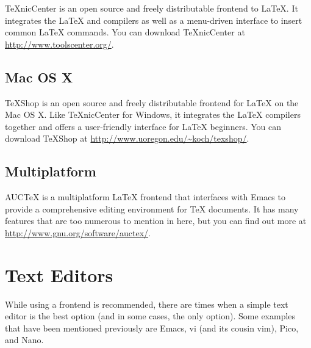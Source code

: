 \TeX{}nicCenter is an open source and freely distributable frontend to
\LaTeX{}.  It integrates the \LaTeX{} and \BibTeX{} compilers as well
as a menu-driven interface to insert common \LaTeX{} commands.  You
can download \TeX{}nicCenter at \url{http://www.toolscenter.org/}.

\subsection{Mac OS X}
\label{sec:mac-os-x-1}

\TeX{}Shop is an open source and freely distributable frontend for
\LaTeX{} on the Mac OS X.  Like \TeX{}nicCenter for Windows, it
integrates the \LaTeX{} compilers together and offers a user-friendly
interface for \LaTeX{} beginners.  You can download \TeX{}Shop at
\url{http://www.uoregon.edu/~koch/texshop/}.

\subsection{Multiplatform}
\label{sec:multiplatform}

AUC\TeX{} is a multiplatform \LaTeX{} frontend that interfaces with
Emacs to provide a comprehensive editing environment for \TeX{}
documents.  It has many features that are too numerous to mention in
here, but you can find out more at
\url{http://www.gnu.org/software/auctex/}.

\section{Text Editors}
\label{sec:text-editors}

While using a frontend is recommended, there are times when a simple
text editor is the best option (and in some cases, the only option).
Some examples that have been mentioned previously are Emacs, vi (and
its cousin vim), Pico, and Nano.

